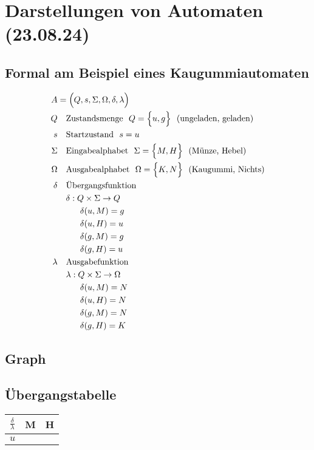\documentclass[12pt,a4paper]{report}
\begin{document}
	\section{Darstellungen von Automaten (23.08.24)}
	\subsection{Formal am Beispiel eines Kaugummiautomaten}
	\begin{align*}
		A &= \Bigl(Q, s, \Sigma, \Omega, \delta, \lambda\Bigl) \\
		Q & \ \ \ \text{Zustandsmenge}\ \ Q = \Bigl\{u, g\Bigl\}\ \ (\text{ungeladen, geladen})\\
		s & \ \ \ \text{Startzustand}\ \ s = u\\
		\Sigma &\ \ \ \text{Eingabealphabet}\ \ \Sigma = \Bigl\{M, H\Bigl\}\ \ (\text{Münze, Hebel})\\
		\Omega & \ \ \ \text{Ausgabealphabet}\ \ \Omega = \Bigl\{K, N\Bigl\}\ \ (\text{Kaugummi, Nichts})\\
		\delta &\ \ \ \text{Übergangsfunktion} \\
		&\ \ \ \delta: Q \times \Sigma \to Q\\
		&\ \ \ \ \ \ \ \ \delta(u,M) = g\\
		&\ \ \ \ \ \ \ \ \delta(u,H) = u\\
		&\ \ \ \ \ \ \ \ \delta(g,M) = g\\
		&\ \ \ \ \ \ \ \ \delta(g,H) = u\\
		\lambda &\ \ \ \text{Ausgabefunktion} \\
		&\ \ \ \lambda: Q \times \Sigma \to \Omega\\
		&\ \ \ \ \ \ \ \ \delta(u,M) = N\\
		&\ \ \ \ \ \ \ \ \delta(u,H) = N\\
		&\ \ \ \ \ \ \ \ \delta(g,M) = N\\
		&\ \ \ \ \ \ \ \ \delta(g,H) = K\\
	\end{align*}
	\subsection{Graph}
	\subsection{Übergangstabelle}
	\begin{tabularx}{\textwidth}{|X|X|X|}
		\hline
		$\frac{\delta}{\lambda}$ & M & H\\
		\hline
		$u$ & $\frac{}{}$ & \\
		
		\hline 
	\end{tabularx}
\end{document}

